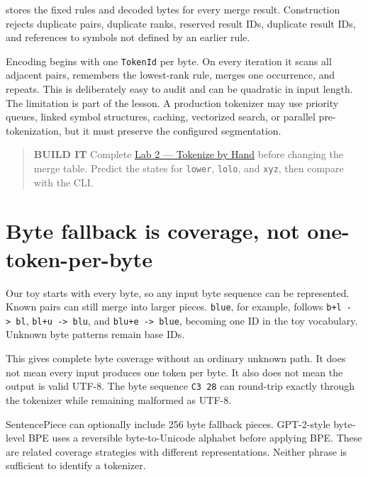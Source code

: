 \texttt{} stores the fixed rules and decoded
bytes for every merge result. Construction rejects duplicate pairs,
duplicate ranks, reserved result IDs, duplicate result IDs, and
references to symbols not defined by an earlier rule.

Encoding begins with one \texttt{TokenId} per byte. On every iteration
it scans all adjacent pairs, remembers the lowest-rank rule, merges one
occurrence, and repeats. This is deliberately easy to audit and can be
quadratic in input length. The limitation is part of the lesson. A
production tokenizer may use priority queues, linked symbol structures,
caching, vectorized search, or parallel pre-tokenization, but it must
preserve the configured segmentation.

\begin{quote}
\textbf{BUILD IT} Complete
\href{https://github.com/hermonai/inside-the-llm-engine/blob/astra-visual-rewrite/labs/lab-02-tokenize-by-hand.md}{Lab
2 --- Tokenize by Hand} before changing the merge table. Predict the
states for \texttt{lower}, \texttt{lolo}, and \texttt{xyz}, then compare
with the CLI.
\end{quote}

\section{Byte fallback is coverage, not
one-token-per-byte}\label{byte-fallback-is-coverage-not-one-token-per-byte}

Our toy starts with every byte, so any input byte sequence can be
represented. Known pairs can still merge into larger pieces.
\texttt{blue}, for example, follows \texttt{b+l\ -\textgreater{}\ bl},
\texttt{bl+u\ -\textgreater{}\ blu}, and
\texttt{blu+e\ -\textgreater{}\ blue}, becoming one ID in the toy
vocabulary. Unknown byte patterns remain base IDs.

This gives complete byte coverage without an ordinary unknown path. It
does not mean every input produces one token per byte. It also does not
mean the output is valid UTF-8. The byte sequence \texttt{C3\ 28} can
round-trip exactly through the tokenizer while remaining malformed as
UTF-8.

SentencePiece can optionally include 256 byte fallback pieces.
GPT-2-style byte-level BPE uses a reversible byte-to-Unicode alphabet
before applying BPE. These are related coverage strategies with
different representations. Neither phrase is sufficient to identify a
tokenizer.

